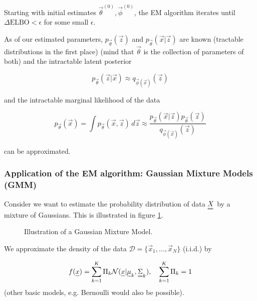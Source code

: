 Starting with initial estimates $\vec{\theta}^{(0)}, \vec{\phi}^{(0)}$, the EM algorithm iterates
until $\Delta \text{ELBO} < \epsilon$ for some small $\epsilon$.



As of our estimated parameters, $p_\vec{\theta}(\vec{z})$ and $p_\vec{\theta}(\vec{x} | \vec{z})$ are known
(tractable distributions in the first place) (mind that $\vec{\theta}$ is the collection
of parameters of both) and the intractable latent posterior

\begin{equation}
    p_\vec{\theta}(\vec{z} | \vec{x}) \approx q_{\vec{\phi}(\vec{x})}(\vec{z})
\end{equation}

and the intractable marginal likelihood of the data

\begin{equation}
    p_\vec{\theta}(\vec{x}) = \int p_\vec{\theta}(\vec{x}, \vec{z}) \, d\vec{z} \approx \frac{p_\vec{\theta}(\vec{x}|\vec{z})p_\vec{\theta}(\vec{z})}{q_{\vec{\phi}(\vec{x})}(\vec{z})}
\end{equation}

can be approximated.

\subsubsection{Application of the EM algorithm: Gaussian Mixture Models (GMM)}
Consider we want to estimate the probability distribution of data $\mat{X}$ by 
a mixture of Gaussians. This is illustrated in figure \ref{fig:gmm}.


\begin{figure}[!htb]
    \centering
    
    \caption{Illustration of a Gaussian Mixture Model.}
    \label{fig:gmm}
\end{figure}

We approximate the density of the data $\mathcal{D} = \{ \vec{x}_1, \dots, \vec{x}_N \}$ (i.i.d.) by

\begin{equation}
    f(\vec{x}) = \sum_{k=1}^{K} \Pi_k \mathcal{N}(\vec{x} | \vec{\mu}_k, \mat{\Sigma}_k), \quad \sum_{k=1}^{K} \Pi_k = 1
\end{equation}
(other basic models, e.g. Bernoulli would also be possible).

